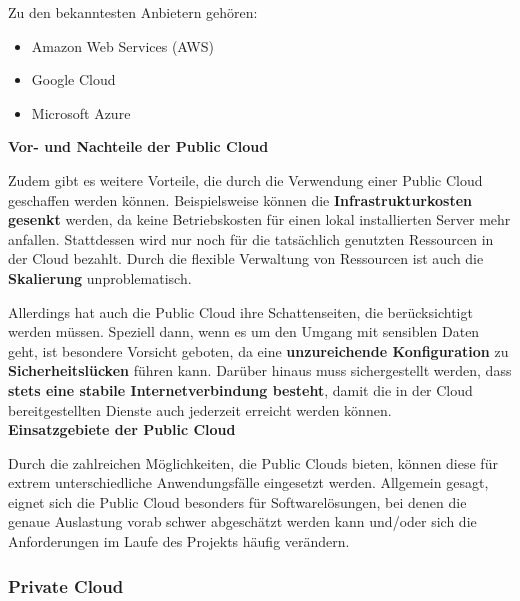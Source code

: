         Zu den bekanntesten Anbietern gehören:
        \begin{itemize}
            \item Amazon Web Services (AWS)
            \item Google Cloud
            \item Microsoft Azure
        \end{itemize}
    
    
        \textbf{Vor- und Nachteile der Public Cloud}
    
        Zudem gibt es weitere Vorteile, die durch die Verwendung einer Public Cloud geschaffen werden können.
        Beispielsweise können die \textbf{Infrastrukturkosten gesenkt} werden, da keine Betriebskosten für einen lokal installierten Server mehr anfallen. Stattdessen wird nur noch für die tatsächlich genutzten Ressourcen in der Cloud bezahlt. Durch die flexible Verwaltung von Ressourcen ist auch die \textbf{Skalierung} unproblematisch. 
    
        Allerdings hat auch die Public Cloud ihre Schattenseiten, die berücksichtigt werden müssen. Speziell dann, wenn es um den Umgang mit sensiblen Daten geht, ist besondere Vorsicht geboten, da eine \textbf{unzureichende Konfiguration} zu \textbf{Sicherheitslücken} führen kann.
        Darüber hinaus muss sichergestellt werden, dass \textbf{stets eine stabile Internetverbindung besteht}, damit die in der Cloud bereitgestellten Dienste auch jederzeit erreicht werden können. \cite{EA:Web53} \\

    
        \textbf{Einsatzgebiete der Public Cloud}
    
        Durch die zahlreichen Möglichkeiten, die Public Clouds bieten, können diese für extrem unterschiedliche Anwendungsfälle eingesetzt werden.
        Allgemein gesagt, eignet sich die Public Cloud besonders für Softwarelösungen, bei denen die genaue Auslastung vorab schwer abgeschätzt werden kann und/oder sich die Anforderungen im Laufe des Projekts häufig verändern.
        \cite{EA:Web53}

        \clearpage
        
    
    
        \subsubsection{Private Cloud}
    
